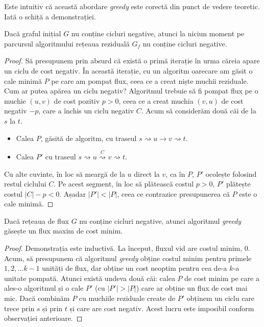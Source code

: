 \documentclass[../main.tex]{subfiles}
\begin{document}
Este intuitiv că această abordare \textit{greedy} este corectă din punct de vedere teoretic. Iată o schiță a demonstrației.

\begin{remark}
  Dacă graful inițial $G$ nu conține cicluri negative, atunci la niciun moment pe parcursul algoritmului rețeaua reziduală $G_f$ nu conține cicluri negative.
\end{remark}

\begin{proof}
  Să presupunem prin absurd că există o primă iterație în urma căreia apare un ciclu de cost negativ. În această iterație, cu un algoritm oarecare am găsit o cale minimă $P$ pe care am pompat flux, ceea ce a creat niște muchii reziduale. Cum ar putea apărea un ciclu negativ? Algoritmul trebuie să fi pompat flux pe o muchie $(u, v)$ de cost pozitiv $p > 0$, ceea ce a creat muchia $(v, u)$ de cost negativ $-p$, care a închis un ciclu negativ $C$. Acum să considerăm două căi de la $s$ la $t$.

  \begin{itemize}
    \item Calea $P$, găsită de algoritm, cu traseul $s \rightsquigarrow u \to v \rightsquigarrow t$.
    \item Calea $P'$ cu traseul $s \rightsquigarrow u \stackrel{C}{\rightsquigarrow} v \rightsquigarrow t$.
  \end{itemize}

  Cu alte cuvinte, în loc să meargă de la $u$ direct la $v$, ca în $P$, $P'$ ocolește folosind restul ciclului $C$. Pe acest segment, în loc să plătească costul $p > 0$, $P'$ plătește costul $|C| - p < 0$. Așadar $|P'| < |P|$, ceea ce contrazice presupunerea că $P$ este o cale minimă.
\end{proof}

\begin{theorem}
  Dacă rețeaua de flux $G$ nu conține cicluri negative, atunci algoritmul \textit{greedy} găsește un flux maxim de cost minim.
\end{theorem}

\begin{proof}
  Demonstrația este inductivă. La început, fluxul vid are costul minim, 0. Acum, să presupunem că algoritmul \textit{greedy} obține costul minim pentru primele $1, 2, \dots k - 1$ unități de flux, dar obține un cost neoptim pentru cea de-a $k$-a unitate pompată. Atunci există undeva două căi: calea $P$ de cost minim pe care a ales-o algoritmul și o cale $P'$ (cu $|P'| > |P|$) care ar obține un flux de cost mai mic. Dacă combinăm $P$ cu muchiile reziduale create de $P'$ obținem un ciclu care trece prin $s$ și prin $t$ și care are cost negativ. Acest lucru este imposibil conform observației anterioare.
\end{proof}
\end{document}
